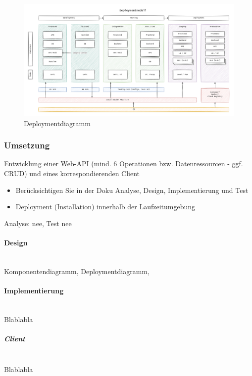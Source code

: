 \documentclass[notitlepage, hidelinks]{article}
\begin{document}
\begin{figure}[H]
\centering
  \includegraphics[width=\textwidth]{images/deployment.png}
  \caption{Deploymentdiagramm}
  \label{fig:deploymentdiagramm}
\end{figure}


\subsubsection{Umsetzung}
Entwicklung einer Web-API (mind. 6 Operationen bzw. Datenressourcen - ggf. CRUD) und eines korrespondierenden Client
\begin{itemize}
\item Berücksichtigen Sie in der Doku Analyse, Design, Implementierung und Test
\item Deployment (Installation) innerhalb der Laufzeitumgebung
\end{itemize}

Analyse: nee, Test nee

\paragraph{Design} \mbox{} \\
Komponentendiagramm, Deploymentdiagramm, 

\paragraph{Implementierung} \mbox{} \\
Blablabla

\subparagraph{Client} \mbox{} \\
Blablabla

\begin{lstlisting}[language=SQL,frame=single,caption=cargo.toml Datei zur Organisation der Abhängigkeiten in Rust,label=toml]

\end{lstlisting}
\end{document}
